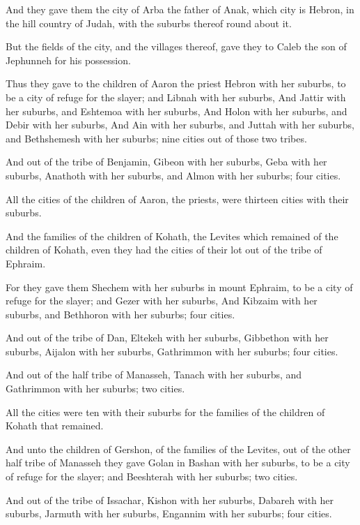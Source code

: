 \Verse And they gave them the city of Arba the father of Anak, which city is Hebron, in the hill country of Judah, with the suburbs thereof round about it.

\Verse But the fields of the city, and the villages thereof, gave they to Caleb the son of Jephunneh for his possession.

\Verse Thus they gave to the children of Aaron the priest Hebron with her suburbs, to be a city of refuge for the slayer; and Libnah with her suburbs, \Verse And Jattir with her suburbs, and Eshtemoa with her suburbs, \Verse And Holon with her suburbs, and Debir with her suburbs, \Verse And Ain with her suburbs, and Juttah with her suburbs, and Bethshemesh with her suburbs; nine cities out of those two tribes.

\Verse And out of the tribe of Benjamin, Gibeon with her suburbs, Geba with her suburbs, \Verse Anathoth with her suburbs, and Almon with her suburbs; four cities.

\Verse All the cities of the children of Aaron, the priests, were thirteen cities with their suburbs.

\Verse And the families of the children of Kohath, the Levites which remained of the children of Kohath, even they had the cities of their lot out of the tribe of Ephraim.

\Verse For they gave them Shechem with her suburbs in mount Ephraim, to be a city of refuge for the slayer; and Gezer with her suburbs, \Verse And Kibzaim with her suburbs, and Bethhoron with her suburbs; four cities.

\Verse And out of the tribe of Dan, Eltekeh with her suburbs, Gibbethon with her suburbs, \Verse Aijalon with her suburbs, Gathrimmon with her suburbs; four cities.

\Verse And out of the half tribe of Manasseh, Tanach with her suburbs, and Gathrimmon with her suburbs; two cities.

\Verse All the cities were ten with their suburbs for the families of the children of Kohath that remained.

\Verse And unto the children of Gershon, of the families of the Levites, out of the other half tribe of Manasseh they gave Golan in Bashan with her suburbs, to be a city of refuge for the slayer; and Beeshterah with her suburbs; two cities.

\Verse And out of the tribe of Issachar, Kishon with her suburbs, Dabareh with her suburbs, \Verse Jarmuth with her suburbs, Engannim with her suburbs; four cities.

